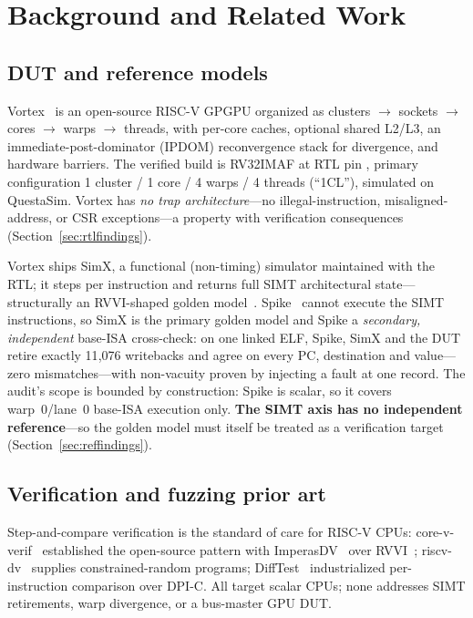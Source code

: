 \documentclass[conference]{IEEEtran}
\newcommand{\code}[1]{\texttt{\detokenize{#1}}}
\begin{document}
\section{Background and Related Work}
\label{sec:positioning}

\subsection{DUT and reference models}
Vortex~\cite{vortex-micro, vortex-carrv} is an open-source RISC-V GPGPU
organized as clusters $\to$ sockets $\to$ cores $\to$ warps $\to$
threads, with per-core caches, optional shared L2/L3, an
immediate-post-dominator (IPDOM) reconvergence stack for divergence,
and hardware barriers. The verified build is RV32IMAF at RTL pin
\code{7a52ee5}, primary configuration 1 cluster / 1 core / 4 warps / 4
threads (``1CL''), simulated on QuestaSim. Vortex has \emph{no trap
	architecture}---no illegal-instruction, misaligned-address, or CSR
exceptions---a property with verification consequences
(Section~\ref{sec:rtlfindings}).

Vortex ships SimX, a functional (non-timing) simulator maintained with
the RTL; it steps per instruction and returns full SIMT architectural
state---structurally an RVVI-shaped golden model~\cite{rvvi}. Spike~\cite{spike}
cannot execute the SIMT instructions, so SimX is the primary golden
model and Spike a \emph{secondary, independent} base-ISA cross-check:
on one linked ELF, Spike, SimX and the DUT retire exactly 11{,}076
writebacks and agree on every PC, destination and value---zero
mismatches---with non-vacuity proven by injecting a fault at one record.
The audit's scope is bounded by construction: Spike is scalar, so it
covers warp~0/lane~0 base-ISA execution only. \textbf{The SIMT axis has
	no independent reference}---so the golden model must itself be treated
as a verification target (Section~\ref{sec:reffindings}).

\subsection{Verification and fuzzing prior art}
Step-and-compare verification is the standard of care for RISC-V CPUs:
core-v-verif~\cite{corevverif} established the open-source pattern with
ImperasDV~\cite{imperasdv} over RVVI~\cite{rvvi}; riscv-dv~\cite{riscvdv}
supplies constrained-random programs; DiffTest~\cite{difftest}
industrialized per-instruction comparison over DPI-C. All target
scalar CPUs; none addresses SIMT retirements, warp divergence, or a
bus-master GPU DUT.
\end{document}
